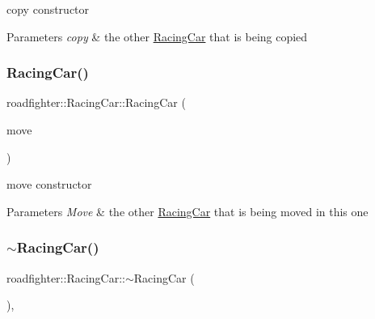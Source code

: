 copy constructor 
\begin{DoxyParams}{Parameters}
{\em copy} & the other \hyperlink{classroadfighter_1_1RacingCar}{Racing\+Car} that is being copied \\
\hline
\end{DoxyParams}
\mbox{\label{classroadfighter_1_1RacingCar_aacfc42aa87c6b5db3f4b80f8fbc68c74}} 
\subsubsection{\texorpdfstring{Racing\+Car()}{RacingCar()}\hspace{0.1cm}{\footnotesize\ttfamily [3/3]}}
{\footnotesize\ttfamily roadfighter\+::\+Racing\+Car\+::\+Racing\+Car (\begin{DoxyParamCaption}\item[{\hyperlink{classroadfighter_1_1RacingCar}{Racing\+Car} \&\&}]{move }\end{DoxyParamCaption})\hspace{0.3cm}{\ttfamily [default]}}

move constructor 
\begin{DoxyParams}{Parameters}
{\em Move} & the other \hyperlink{classroadfighter_1_1RacingCar}{Racing\+Car} that is being moved in this one \\
\hline
\end{DoxyParams}
\mbox{\label{classroadfighter_1_1RacingCar_a1ae41bc99dca96cde8187f4ba2172ea7}} 
\subsubsection{\texorpdfstring{$\sim$\+Racing\+Car()}{~RacingCar()}}
{\footnotesize\ttfamily roadfighter\+::\+Racing\+Car\+::$\sim$\+Racing\+Car (\begin{DoxyParamCaption}{ }\end{DoxyParamCaption})\hspace{0.3cm}{\ttfamily [override]}, {\ttfamily [default]}}

